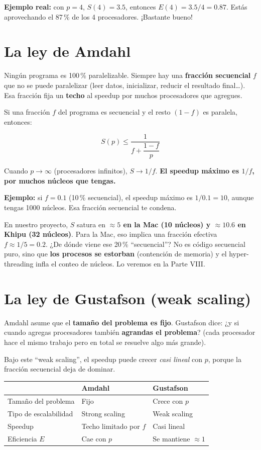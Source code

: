 \documentclass[11pt,a4paper]{article}
\begin{document}
\textbf{Ejemplo real:} con $p=4$, $S(4)=3.5$, entonces $E(4)=3.5/4=0.87$. Estás
aprovechando el 87\,\% de los 4 procesadores. ¡Bastante bueno!

\section{La ley de Amdahl}

\begin{importante}[title=\textbf{Ley de Amdahl --- la idea central}]
Ningún programa es 100\,\% paralelizable. Siempre hay una \textbf{fracción
secuencial} $f$ que no se puede paralelizar (leer datos, inicializar, reducir el
resultado final\ldots). Esa fracción fija un \textbf{techo} al speedup por muchos
procesadores que agregues.
\end{importante}

Si una fracción $f$ del programa es secuencial y el resto $(1-f)$ es paralela,
entonces:

\[
S(p) \le \frac{1}{f+\dfrac{1-f}{p}}
\]

Cuando $p\to\infty$ (procesadores infinitos), $S\to 1/f$. \textbf{El speedup
máximo es $1/f$, por muchos núcleos que tengas.}

\textbf{Ejemplo:} si $f=0.1$ (10\,\% secuencial), el speedup máximo es
$1/0.1=10$, aunque tengas 1000 núcleos. Esa fracción secuencial te condena.

En nuestro proyecto, $S$ satura en \textbf{$\approx 5$ en la Mac (10 núcleos) y
$\approx 10.6$ en Khipu (32 núcleos)}. Para la Mac, eso implica una fracción
efectiva $f\approx 1/5 = 0.2$. ¿De dónde viene ese 20\,\% ``secuencial''? No es
código secuencial puro, sino que \textbf{los procesos se estorban} (contención de
memoria) y el hyper-threading infla el conteo de núcleos. Lo veremos en la
Parte VIII.

\section{La ley de Gustafson (weak scaling)}

Amdahl asume que el \textbf{tamaño del problema es fijo}. Gustafson dice: ¿y si
cuando agregas procesadores también \textbf{agrandas el problema}? (cada
procesador hace el mismo trabajo pero en total se resuelve algo más grande).

Bajo este ``weak scaling'', el speedup puede crecer \emph{casi lineal} con $p$,
porque la fracción secuencial deja de dominar.

\begin{caja}[title=\textbf{Resumen Amdahl vs Gustafson}]
\begin{tabular}{lll}
& \textbf{Amdahl} & \textbf{Gustafson} \\\midrule
Tamaño del problema & Fijo & Crece con $p$ \\
Tipo de escalabilidad & Strong scaling & Weak scaling \\
Speedup & Techo limitado por $f$ & Casi lineal \\
Eficiencia $E$ & Cae con $p$ & Se mantiene $\approx 1$ \\
\end{tabular}
\end{caja}
\end{document}
